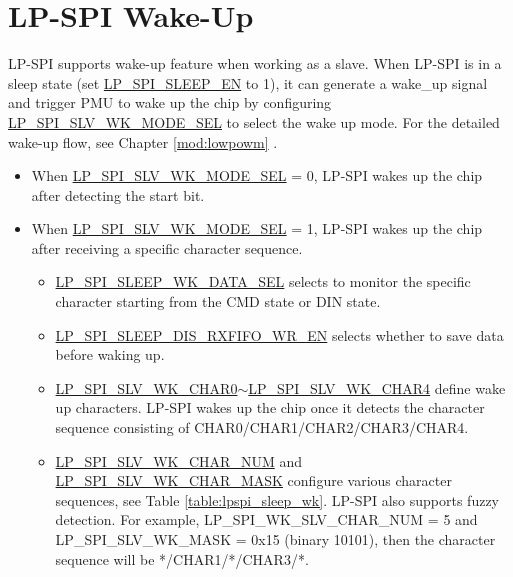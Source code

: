 \documentclass[main\_\_EN.tex]{subfiles}
\begin{document}
\section{LP-SPI Wake-Up}
LP-SPI supports wake-up feature when working as a slave. When LP-SPI is in a sleep state (set \hyperref[fielddesc:LPSPISLEEPEN]{LP\_SPI\_SLEEP\_EN} to 1), it can generate a wake\_up signal and trigger PMU to wake up the chip by configuring \hyperref[fielddesc:LPSPISLVWKMODESEL]{LP\_SPI\_SLV\_WK\_MODE\_SEL} to select the wake up mode. For the detailed wake-up flow, see Chapter \ref{mod:lowpowm} \textit{}.
\begin{itemize}
    \item When \hyperref[fielddesc:LPSPISLVWKMODESEL]{LP\_SPI\_SLV\_WK\_MODE\_SEL} = 0, LP-SPI wakes up the chip after detecting the start bit.
    \item When \hyperref[fielddesc:LPSPISLVWKMODESEL]{LP\_SPI\_SLV\_WK\_MODE\_SEL} = 1, LP-SPI wakes up the chip after receiving a specific character sequence.
    \begin{itemize}
        \item \hyperref[fielddesc:LPSPISLEEPWKDATASEL]{LP\_SPI\_SLEEP\_WK\_DATA\_SEL} selects to monitor the specific character starting from the CMD state or DIN state.
        \item \hyperref[fielddesc:LPSPISLEEPDISRXFIFOWREN]{LP\_SPI\_SLEEP\_DIS\_RXFIFO\_WR\_EN} selects whether to save data before waking up.
        \item \hyperref[fielddesc:LPSPISLVWKCHAR0]{LP\_SPI\_SLV\_WK\_CHAR0}$\sim$\hyperref[fielddesc:LPSPISLVWKCHAR1]{LP\_SPI\_SLV\_WK\_CHAR4} define wake up characters. LP-SPI wakes up the chip once it detects the character sequence consisting of CHAR0/CHAR1/CHAR2/CHAR3/CHAR4.
        \item \hyperref[fielddesc:LPSPISLVWKCHARNUM]{LP\_SPI\_SLV\_WK\_CHAR\_NUM} and \hyperref[fielddesc:LPSPISLVWKCHARMASK]{LP\_SPI\_SLV\_WK\_CHAR\_MASK} configure various character sequences, see Table \ref{table:lpspi_sleep_wk}. LP-SPI also supports fuzzy detection. For example, LP\_SPI\_WK\_SLV\_CHAR\_NUM = 5 and LP\_SPI\_SLV\_WK\_MASK = 0x15 (binary 10101), then the character sequence will be */CHAR1/*/CHAR3/*.
    \end{itemize}
\end{itemize}
\end{document}
